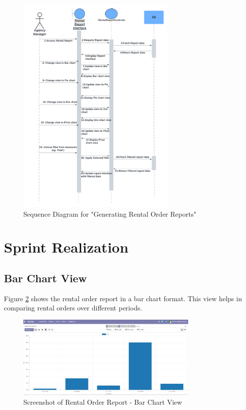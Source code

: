 \begin{figure}[h]
    \centering
    \includegraphics[width=0.7\textwidth]{sprint3/Sprint3Sequence.png} %
    \caption{Sequence Diagram for "Generating Rental Order Reports"}
    \label{fig:report_sequence_diagram}
\end{figure}


\section{Sprint Realization}


\subsection{Bar Chart View}
Figure \ref{fig:bar_chart_view} shows the rental order report in a bar chart format. This view helps in comparing rental orders over different periods.

\begin{figure}[h]
    \centering
    \includegraphics[width=0.8\textwidth]{sprint3/reportbarchart.png} %
    \caption{Screenshot of Rental Order Report - Bar Chart View}
    \label{fig:bar_chart_view}
\end{figure}

